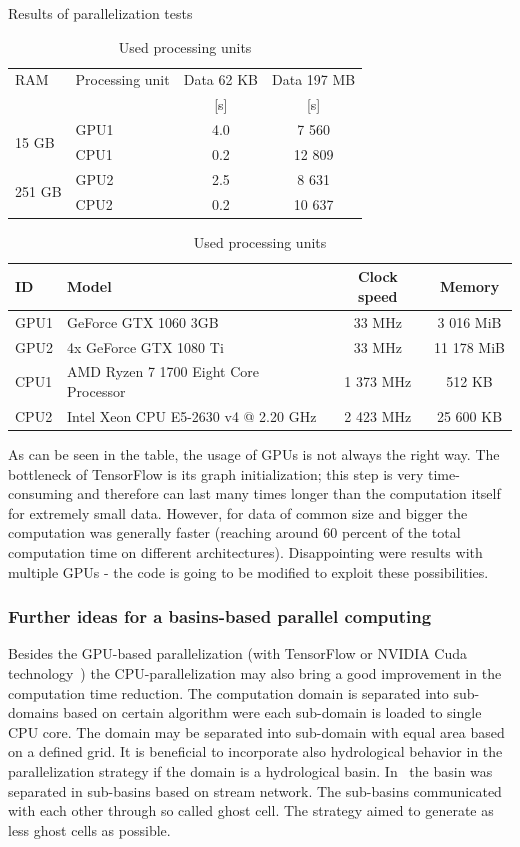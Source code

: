 \begin{table}[h]
  \centering
  \caption{Results of parallelization tests}
  \makegapedcells
  \begin{tabular}{|l|p{2.2cm}|c|c|}\hline
    RAM & Processing unit & Data 62 KB & Data 197 MB\\
     & & [s] & [s]\\\hline
    \multirow{2}{*}{15 GB} & GPU1 & 4.0 & 7 560\\
    & CPU1 & 0.2 & 12 809\\\hline
    \multirow{2}{*}{251 GB} & GPU2 & 2.5 & 8 631\\
    & CPU2 & 0.2 & 10 637\\\hline
  \end{tabular}
  \label{tab:GPU_results}
  \caption{Used processing units}
  \begin{tabular}{|l|p{1.9cm}|c|c|}\hline
    ID & Model & Clock speed & Memory\\\hline
    GPU1 & GeForce GTX 1060 3GB & 33 MHz & 3 016 MiB \\\hline
    GPU2 & 4x GeForce GTX 1080 Ti & 33 MHz & 11 178 MiB \\\hline
    CPU1 & AMD Ryzen 7 1700 Eight Core Processor & 1 373 MHz & 512 KB \\\hline
    CPU2 & Intel Xeon CPU E5-2630 v4 @ 2.20 GHz & 2 423 MHz & 25 600 KB \\\hline
  \end{tabular}
\end{table}

As can be seen in the table, the usage of GPUs is not always the right way.
The bottleneck of TensorFlow is its graph initialization; this step is very
time-consuming and therefore can last many times longer than the computation
itself for extremely small data. However, for data of common size and bigger
the computation was generally faster (reaching around 60 percent of the total
computation time on different architectures). Disappointing were results with
multiple GPUs - the code is going to be modified to exploit these
possibilities.

\subsubsection{Further ideas for a basins-based parallel computing}
Besides the GPU-based parallelization (with TensorFlow \cite{tensorflow2015-whitepaper} or
NVIDIA Cuda technology~\cite{Kalyanapu2011,Le2015}) the
CPU-parallelization may also bring a good improvement in the computation
time reduction. The computation domain is separated into sub-domains
based on certain algorithm were each sub-domain is loaded to single
CPU core. The domain may be separated into sub-domain with equal area
based on a defined grid. It is beneficial to incorporate also
hydrological behavior in the parallelization
strategy if the domain is a hydrological basin. 
In~\cite{Vivoni2011} the basin was separated in sub-basins
based on stream network. The sub-basins communicated with each other through so called
ghost cell. The strategy aimed to generate as less ghost cells as
possible.

